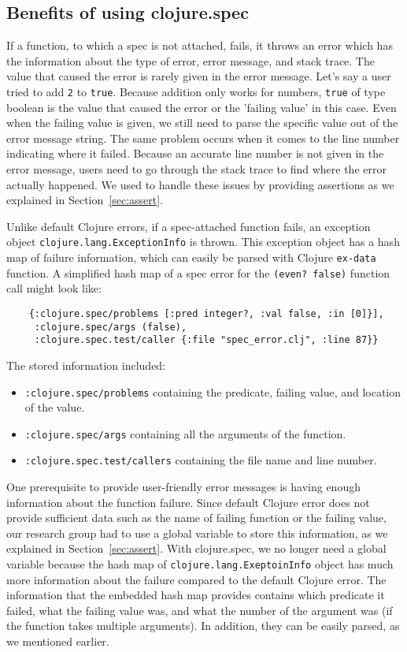\documentclass[12pt]{article}
\begin{document}
	\subsection{Benefits of using clojure.spec}
	If a function, to which a spec is not attached, fails,
	it throws an error which has the information about the type of error, error message, and stack 
	trace. The value that caused the error is rarely given in the error message.
	Let's say a user tried to add {\tt 2} to {\tt true}. Because addition only works for numbers, 
	{\tt true} of type boolean is the value that caused the error or the 'failing value' in this case.
	Even when the failing value is given, we still need to parse the specific value out of 
	the error message string. The same problem occurs when it comes to the line number indicating where it failed. 
	Because an accurate line number is not given in the error message, users need to go through the stack trace to find 
	where the error actually happened. We used to handle these issues by providing assertions as we explained in Section~\ref{sec:assert}.

	Unlike default Clojure errors, if a spec-attached function fails, an exception object 
	\newline	
	{\tt clojure.lang.ExceptionInfo} is thrown. 
	This exception object has a hash map of failure information, which can easily be 
	parsed with Clojure {\tt ex-data} function. A simplified hash map of a spec error 
	for the {\tt (even? false)} function call might look like:
	\begin{verbatim}
	{:clojure.spec/problems [:pred integer?, :val false, :in [0]}], 
	 :clojure.spec/args (false), 
	 :clojure.spec.test/caller {:file "spec_error.clj", :line 87}}
	\end{verbatim}
	The stored information included:
	\begin{itemize}
	\item {\tt :clojure.spec/problems} containing the predicate, failing value, and location of the value.
	\item {\tt :clojure.spec/args} containing all the arguments of the function.
	\item {\tt :clojure.spec.test/callers} containing the file name and line number.
	\end{itemize}

	One prerequisite to provide user-friendly error messages is having enough information about the function failure. Since 
	default Clojure error does not provide sufficient data such as the name of failing function or the failing value, our 
	research group had to use a global variable to store this information, as we explained in Section~\ref{sec:assert}. 
	With clojure.spec, we no longer need a global variable because the hash map of {\tt clojure.lang.ExeptoinInfo} object 
	has much more information about the 
	failure compared to the default Clojure error. The information that the embedded hash map provides contains which predicate it 
	failed, what the failing value was, and what the number of the argument was (if the function takes multiple arguments). 
	In addition, they can be easily parsed, as we mentioned earlier. 
	
\end{document}
